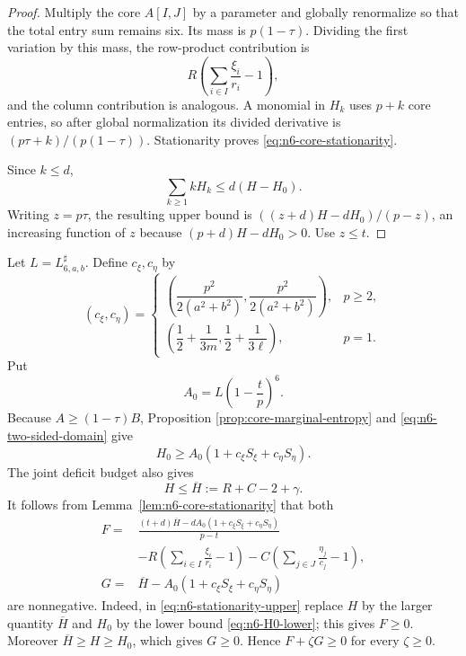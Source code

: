 \documentclass[11pt]{article}
\theoremstyle{definition}
\newcommand{\1}{\mathbf{1}}
\begin{document}
\begin{proof}
Multiply the core $A[I,J]$ by a parameter and globally renormalize so that
the total entry sum remains six.  Its mass is $p(1-\tau)$.  Dividing the
first variation by this mass, the row-product contribution is
\[
 R\left(\sum_{i\in I}\frac{\xi_i}{r_i}-1\right),
\]
and the column contribution is analogous.  A monomial in $H_k$ uses
$p+k$ core entries, so after global normalization its divided derivative is
$(p\tau+k)/(p(1-\tau))$.  Stationarity proves
\eqref{eq:n6-core-stationarity}.

Since $k\le d$,
\[
 \sum_{k\ge1}kH_k\le d(H-H_0).
\]
Writing $z=p\tau$, the resulting upper bound is
$((z+d)H-dH_0)/(p-z)$, an increasing function of $z$ because
$(p+d)H-dH_0>0$.  Use $z\le t$.
\end{proof}

Let $L=L^{\sharp}_{6,a,b}$.  Define $c_\xi,c_\eta$ by
\begin{equation}\label{eq:n6-entropy-coefficients}
 (c_\xi,c_\eta)=
 \begin{cases}
 \left(\dfrac{p^2}{2(a^2+b^2)},
       \dfrac{p^2}{2(a^2+b^2)}\right),&p\ge2,\\[3mm]
 \left(\dfrac12+\dfrac1{3m},
       \dfrac12+\dfrac1{3\ell}\right),&p=1.
 \end{cases}
\end{equation}
Put
\begin{equation}\label{eq:n6-A0}
 A_0=L\left(1-\frac tp\right)^6.
\end{equation}
Because $A\ge(1-\tau)B$, Proposition
\ref{prop:core-marginal-entropy} and \eqref{eq:n6-two-sided-domain} give
\begin{equation}\label{eq:n6-H0-lower}
 H_0\ge A_0(1+c_\xi S_\xi+c_\eta S_\eta).
\end{equation}
The joint deficit budget also gives
\begin{equation}\label{eq:n6-Hbar}
 H\le\overline H:=R+C-2+\gamma.
\end{equation}
It follows from Lemma~\ref{lem:n6-core-stationarity} that both
\begin{align}
 F={}&
 \frac{(t+d)\overline H-dA_0(1+c_\xi S_\xi+c_\eta S_\eta)}{p-t}
 \nonumber\\[-1mm]
 &-R\left(\sum_{i\in I}\frac{\xi_i}{r_i}-1\right)
 -C\left(\sum_{j\in J}\frac{\eta_j}{c_j}-1\right),\label{eq:n6-F}\\
 G={}&\overline H-A_0(1+c_\xi S_\xi+c_\eta S_\eta)\label{eq:n6-G}
\end{align}
are nonnegative.  Indeed, in \eqref{eq:n6-stationarity-upper} replace
$H$ by the larger quantity $\overline H$ and $H_0$ by the lower bound
\eqref{eq:n6-H0-lower}; this gives $F\ge0$.  Moreover
$\overline H\ge H\ge H_0$, which gives $G\ge0$.  Hence
$F+\zeta G\ge0$ for every $\zeta\ge0$.
\end{document}
